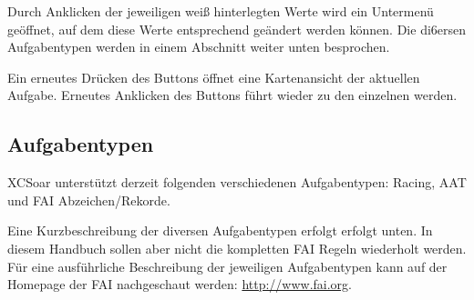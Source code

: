 Durch Anklicken der jeweiligen weiß hinterlegten Werte wird ein Untermenü geöffnet, auf dem diese Werte entsprechend geändert werden können. Die di^^versen Aufgabentypen werden in einem Abschnitt weiter unten besprochen.

Ein erneutes Drücken des Buttons   öffnet eine Kartenansicht der aktuellen Aufgabe. Erneutes Anklicken des Buttons führt wieder zu den einzelnen werden.

\subsection*{Aufgabentypen}

\textsf{XCSoar} unterstützt derzeit folgenden verschiedenen Aufgabentypen:
Racing, AAT und FAI Abzeichen/Rekorde.

Eine Kurzbeschreibung der diversen Aufgabentypen erfolgt erfolgt unten. In diesem Handbuch sollen aber nicht die kompletten FAI Regeln wiederholt werden. Für eine ausführliche Beschreibung der jeweiligen Aufgabentypen kann  auf der Homepage der FAI nachgeschaut werden: \url{http://www.fai.org}.

